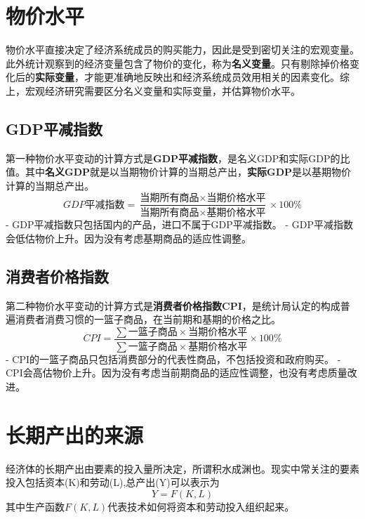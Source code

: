 \documentclass[
  11pt,
  letterpaper,
]{ctexbook}
\begin{document}
\section{物价水平}\label{ux7269ux4ef7ux6c34ux5e73}

物价水平直接决定了经济系统成员的购买能力，因此是受到密切关注的宏观变量。此外统计观察到的经济变量包含了物价的变化，称为\textbf{名义变量}。只有剔除掉价格变化后的\textbf{实际变量}，才能更准确地反映出和经济系统成员效用相关的因素变化。综上，宏观经济研究需要区分名义变量和实际变量，并估算物价水平。

\subsection{GDP平减指数}\label{gdpux5e73ux51cfux6307ux6570}

第一种物价水平变动的计算方式是\textbf{GDP平减指数}，是名义GDP和实际GDP的比值。其中\textbf{名义GDP}就是以当期物价计算的当期总产出，\textbf{实际GDP}是以基期物价计算的当期总产出。
\[
GDP\text{平减指数} = \frac{\text{当期所有商品} \times \text{当期价格水平}}{\text{当期所有商品} \times \text{基期价格水平}} \times 100\%
\] - GDP平减指数只包括国内的产品，进口不属于GDP平减指数。 -
GDP平减指数会低估物价上升。因为没有考虑基期商品的适应性调整。

\subsection{消费者价格指数}\label{ux6d88ux8d39ux8005ux4ef7ux683cux6307ux6570}

第二种物价水平变动的计算方式是\textbf{消费者价格指数CPI}，是统计局认定的构成普遍消费者消费习惯的一篮子商品，在当前期和基期的价格之比。\\
\[
CPI=\frac{\sum \text{一篮子商品} \times \text{当期价格水平}}{\sum \text{一篮子商品} \times \text{基期价格水平}} \times 100\%
\] - CPI的一篮子商品只包括消费部分的代表性商品，不包括投资和政府购买。 -
CPI会高估物价上升。因为没有考虑当前期商品的适应性调整，也没有考虑质量改进。

\section{长期产出的来源}\label{sec:ch1-sec5}

经济体的长期产出由要素的投入量所决定，所谓积水成渊也。现实中常关注的要素投入包括资本(K)和劳动(L),总产出(Y)可以表示为
\[
Y=F(K,L)
\] 其中生产函数\(F(K,L)\)代表技术如何将资本和劳动投入组织起来。
\end{document}
